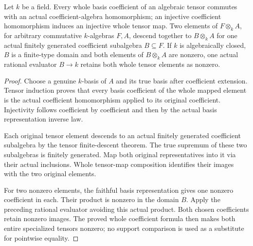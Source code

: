 \begin{theorem}
\label{algebra:whole-tensor-rational-specialization}
\leanok
{}
Let $k$ be a field. Every whole basis coefficient of an algebraic tensor
commutes with an actual coefficient-algebra homomorphism; an injective
coefficient homomorphism induces an injective whole tensor map.
Two elements of $F\otimes_k A$, for arbitrary commutative $k$-algebras
$F,A$, descend together to $B\otimes_k A$ for one actual finitely
generated coefficient subalgebra $B\subseteq F$.
If $k$ is algebraically closed, $B$ is a finite-type domain and both
elements of $B\otimes_k A$ are nonzero, one actual rational evaluator
$B\to k$ retains both whole tensor elements as nonzero.
\end{theorem}
\begin{proof}
Choose a genuine $k$-basis of $A$ and its true basis after coefficient
extension. Tensor induction proves that every basis coefficient of the
whole mapped element is the actual coefficient homomorphism applied
to its original coefficient. Injectivity follows coefficient by
coefficient and then by the actual basis representation inverse law.

Each original tensor element descends to an actual finitely generated
coefficient subalgebra by the tensor finite-descent theorem. The true
supremum of these two subalgebras is finitely generated. Map both original
representatives into it via their actual inclusions. Whole tensor-map
composition identifies their images with the two original elements.

For two nonzero elements, the faithful basis representation gives one
nonzero coefficient in each. Their product is nonzero in the domain $B$.
Apply the preceding rational evaluator avoiding this actual product.
Both chosen coefficients retain nonzero images. The proved whole
coefficient formula then makes both entire specialized tensors nonzero;
no support comparison is used as a substitute for pointwise equality.
\end{proof}

